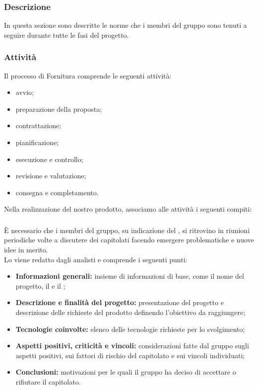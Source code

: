 \subsubsection{Descrizione}
In questa sezione sono descritte le norme che i membri del gruppo \Omicron{} sono tenuti a seguire durante tutte le fasi del progetto.

\subsubsection{Attività}
Il processo di Fornitura comprende le seguenti attività:
\begin{itemize}
	\item avvio;
	\item preparazione della proposta;
	\item contrattazione;
	\item pianificazione;
	\item esecuzione e controllo;
	\item revisione e valutazione;
	\item consegna e completamento.
\end{itemize}
Nella realizzazione del nostro prodotto, associamo alle attività i seguenti compiti:


\subsubsection{\SdF}
È necessario che i membri del gruppo, su indicazione del \respProg, si ritrovino in riunioni periodiche volte a discutere dei capitolati facendo emergere problematiche e nuove idee in merito.\\
Lo \SdFv{}viene redatto dagli analisti e comprende i seguenti punti:
\begin{itemize}
    \item \textbf{Informazioni generali:} insieme di informazioni di base, come il nome del progetto, il \proponProg{} e il \commitProg{};
    \item \textbf{Descrizione e finalità del progetto:} presentazione del progetto e descrizione delle richieste del prodotto definendo l'obiettivo da raggiungere;
    \item \textbf{Tecnologie coinvolte:} elenco delle tecnologie richieste per lo svolgimento;
    \item \textbf{Aspetti positivi, criticità e vincoli:} considerazioni fatte dal gruppo sugli aspetti positivi, sui fattori di rischio del capitolato e sui vincoli individuati;
    \item \textbf{Conclusioni:} motivazioni per le quali il gruppo ha deciso di accettare o rifiutare il capitolato.
\end{itemize}


